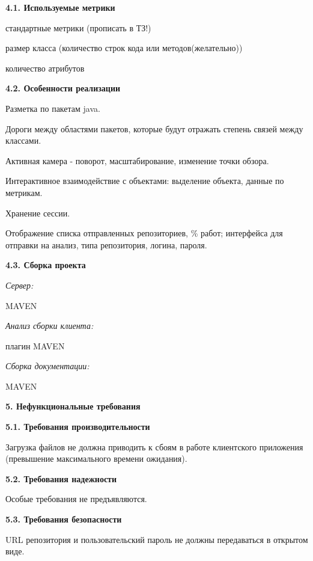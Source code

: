 \documentclass[a4paper,12pt]{article}
\begin{document}
	\textbf{4.1.	Используемые метрики}
	\newline
	
	стандартные метрики (прописать в ТЗ!) 
	
	размер класса (количество строк кода или методов(желательно))
	
	количество атрибутов
	\newline
	
	\textbf{4.2.	Особенности реализации}
	\newline
	
		Разметка по пакетам java.
		
		Дороги между областями пакетов, которые будут отражать степень связей между классами.
		
		Активная камера - поворот, масштабирование, изменение точки обзора.
		
		Интерактивное взаимодействие с объектами: выделение объекта, данные по метрикам.

		Хранение сессии.

		Отображение списка отправленных репозиториев, \% работ; интерфейса для отправки на анализ, типа репозитория, логина, пароля.
		\newline
		
	\textbf{4.3.	Сборка проекта}
	\newline
	
	\textit{Сервер:}
	
	MAVEN
	\newline
	
	\textit{Анализ сборки клиента:}
	
	плагин MAVEN
	\newline
	
	\textit{Сборка документации:}
	
	MAVEN

\maketitle
\newpage
\textbf{5. Нефункциональные требования}
\newline

	\textbf{5.1.	Требования производительности}
	
		Загрузка файлов не должна приводить к сбоям в работе клиентского приложения (превышение максимального времени ожидания).
		\newline
		
	\textbf{5.2.	Требования надежности}
	
		Особые требования не предъявляются.
	\newline
	
	\textbf{5.3.	Требования безопасности}
	
		URL репозитория и пользовательский пароль не должны передаваться в открытом виде.
	\newline
\end{document}
